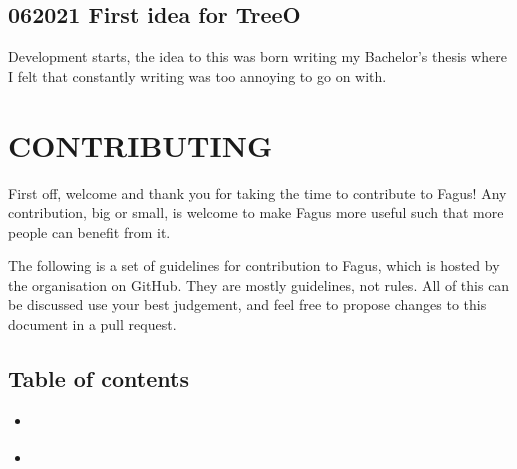 \documentclass[a4paper,10pt,english]{sphinxmanual}
\begin{document}
\section{06\sphinxhyphen{}2021 First idea for TreeO}
\label{\detokenize{CHANGELOG:first-idea-for-treeo}}
\sphinxAtStartPar
Development starts, the idea to this was born writing my Bachelor’s thesis where I felt that constantly writing  was too annoying to go on with.

\sphinxstepscope


\chapter{CONTRIBUTING}
\label{\detokenize{CONTRIBUTING:contributing}}\label{\detokenize{CONTRIBUTING::doc}}
\sphinxAtStartPar
First off, welcome and thank you for taking the time to contribute to Fagus! Any contribution, big or small, is welcome to make Fagus more useful such that more people can benefit from it.

\sphinxAtStartPar
The following is a set of guidelines for contribution to Fagus, which is hosted by the  organisation on GitHub. They are mostly guidelines, not rules. All of this can be discussed \sphinxhyphen{} use your best judgement, and feel free to propose changes to this document in a pull request.


\section{Table of contents}
\label{\detokenize{CONTRIBUTING:table-of-contents}}
\sphinxAtStartPar
{\hyperref[\detokenize{CONTRIBUTING:fagus-principles}]{}}

\sphinxAtStartPar
{\hyperref[\detokenize{CONTRIBUTING:how-can-i-contribute}]{}}
\begin{itemize}
\item {}
\sphinxAtStartPar
{\hyperref[\detokenize{CONTRIBUTING:reporting-bugs}]{}}

\item {}
\sphinxAtStartPar
{\hyperref[\detokenize{CONTRIBUTING:requesting-new-features}]{}}

\end{itemize}
\end{document}
